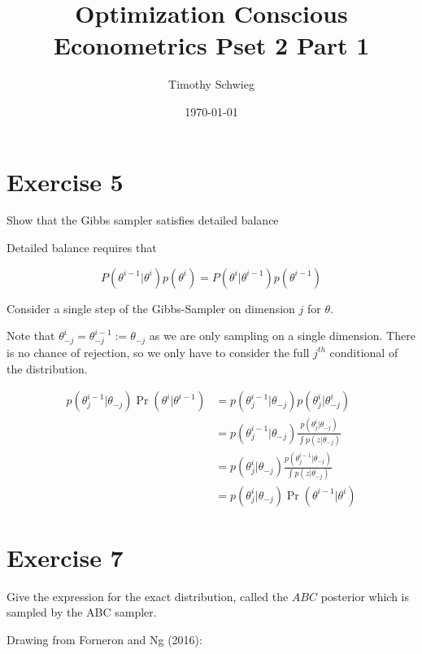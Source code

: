 \documentclass[12pt]{paper}
\author{Timothy Schwieg}
\date{\today}
\title{Optimization Conscious Econometrics Pset 2 Part 1}
\begin{document}
\maketitle

\section{Exercise 5}

Show that the Gibbs sampler satisfies detailed balance

\vspace{.3in}

Detailed balance requires that

\begin{equation*}
  P( \theta^{i-1} \vert \theta^i) p(\theta^i) = P( \theta^i \vert \theta^{i-1}) p(\theta^{i-1})  
\end{equation*}


Consider a single step of the Gibbs-Sampler on dimension $j$ for $\theta$.

Note that $\theta_{-j}^i = \theta_{-j}^{i-1} := \theta_{-j}$ as we are only sampling on a
single dimension. There is no chance of rejection, so we only have
to consider the full $j^{th}$ conditional of the distribution.


\begin{align*}
  p(\theta_j^{i-1}\vert \theta_{-j} ) \Pr( \theta^i \vert \theta^{i-1}) &= p(\theta_j^{i-1}\vert \theta_{-j} ) p( \theta_j^i \vert \theta_{-j}^i )\\
            &= p(\theta_j^{i-1}\vert \theta_{-j} ) \frac{ p(\theta_j^i \vert \theta_{-j})}{\int p( z \vert\theta_{-j})}\\
            &= p( \theta_j^i \vert \theta_{-j}) \frac{ p(\theta_j^{i-1}\vert \theta_{-j} ) }{\int p(z \vert \theta_{-j})}\\
            &= p( \theta_j^i \vert \theta_{-j}) \Pr( \theta^{i-1} \vert \theta^i)
\end{align*}




\section{Exercise 7}

Give the expression for the exact distribution, called the $ABC$
posterior which is sampled by the ABC sampler.

\vspace{.3in}

Drawing from Forneron and Ng (2016):
\end{document}
